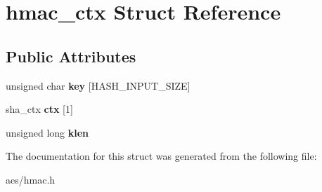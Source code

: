 \hypertarget{structhmac__ctx}{}\section{hmac\+\_\+ctx Struct Reference}
\label{structhmac__ctx}
\subsection*{Public Attributes}
\begin{DoxyCompactItemize}
\item 
unsigned char {\bfseries key} \mbox{[}H\+A\+S\+H\+\_\+\+I\+N\+P\+U\+T\+\_\+\+S\+I\+ZE\mbox{]}\hypertarget{structhmac__ctx_a5e87718622cab4b0db1fe9f99151cf90}{}\label{structhmac__ctx_a5e87718622cab4b0db1fe9f99151cf90}

\item 
sha\+\_\+ctx {\bfseries ctx} \mbox{[}1\mbox{]}\hypertarget{structhmac__ctx_ae9928399a7e66e3d382bfa6fa06dc0fb}{}\label{structhmac__ctx_ae9928399a7e66e3d382bfa6fa06dc0fb}

\item 
unsigned long {\bfseries klen}\hypertarget{structhmac__ctx_ae6b925d6d8f5f526cabc9e50f2828385}{}\label{structhmac__ctx_ae6b925d6d8f5f526cabc9e50f2828385}

\end{DoxyCompactItemize}


The documentation for this struct was generated from the following file\+:\begin{DoxyCompactItemize}
\item 
aes/hmac.\+h\end{DoxyCompactItemize}
